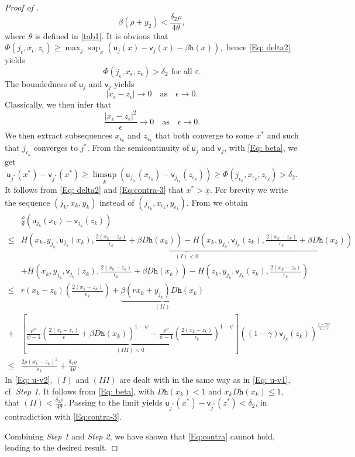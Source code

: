 \documentclass[11pt]{article}
\numberwithin{equation}{section}
\theoremstyle{definition}
\def\su{{\mathsf{u}}}
\def\sv{{\mathsf{v}}}
\newcommand{\eps}{\varepsilon}
\newcommand{\ux}{{\underline x}}
\newcommand{\beq}{\begin{equation}}
\newcommand{\eeq}{\end{equation}}
\newcommand{\f}{\frac}
\newcommand{\e}{\epsilon}
\newcommand{\g}{\gamma}
\newcommand{\p}{\psi}
\theoremstyle{plain}
\begin{document}
\begin{appendices}
\begin{proof}[Proof of ]
\beq\label{Eq: beta}
\beta(\rho+y_2)<\frac{\delta_2 \rho}{4\theta},
\eeq
where $\theta$ is defined in \cref{tab1}. It is obvious that 
$
\Phi(j_\e,x_\e,z_\e)\geq \max_j\sup_x(\mathsf{u}_j(x)-\mathsf{v}_j(x)-\beta \mathtt{h}(x)),
$
hence \cref{Eq: delta2} yields
 $$\Phi(j_\e,x_\e,z_\e)>\delta_2\,\,{\text{for all}}\, \,\eps.$$
The boundedness of $\mathsf{u}_j$ and $\mathsf{v}_j$ yields
{}{
$$
\vert x_\e-z_\e \vert\to 0\quad {\text{as}}\quad \e\to 0.
$$
}
Classically, we then infer that
{}{
$$
\frac{\vert x_\e-z_\e \vert^2}{\e}\to 0\quad {\text{as}}\quad \e\to 0.
$$
}
We then extract subsequences $x_{\e_k}$ and {}{$z_{\e_k}$} that both converge to some $x^*$ and such that $j_{\e_k}$ converges to $j^*$. 
From the semicontinuity of $\mathsf{u}_j$ and $\mathsf{v}_j$, with \eqref{Eq: beta}, we get 
\beq\label{Eq:contra-3}
\su_{j^*}(x^*)-\sv_{j^*}(x^*)\geq \limsup_k(\mathsf{u}_{j_{\e_k}}(x_{\e_k})-\mathsf{v}_{j_{\e_k}}(z_{\e_k}))\geq \Phi(j_{\e_k},x_{\e_k},z_{\e_k})>\delta_2.
\eeq
It follows from \cref{Eq: delta2} and \cref{Eq:contra-3} that $x^*>\ux$. 
For brevity we write the sequence $(j_{k},x_k,y_k)$ instead of $(j_{\e_k},x_{\e_k},y_{\e_k})$. From  we obtain
\begin{equation}\label{Eq: u-v2}
\begin{aligned}
&\frac{\rho}{\theta} (\su_{j_k}(x_k)-\sv_{j_k}(z_k) )\\
\leq {}&\underbrace{H\left(x_k,y_{j_{k}},\mathsf{u}_{j_{k}}(x_k),\f{2(x_k-z_k)}{\e_k}+\beta D\mathtt{h}(x_k)\right)-H\left(x_k,y_{j_k},\mathsf{v}_{j_{k}}(z_{k}),\f{2(x_k-z_k)}{\e_k}+\beta D\mathtt{h}(x_k)\right)}_{(I)<0}\\
&+H\left(x_{k},y_{j_{k}},\mathsf{v}_{j_{k}}(z_{k}),\f{2(x_k-z_k)}{\e_k}+\beta D\mathtt{h}(x_k)\right)-H\left(z_{k},y_{j_{k}},\mathsf{v}_{j_{k}}(z_{k}),\f{2(x_k-z_k)}{\e_k}\right)\\
\leq {}& r(x_{k}-z_{k})\left(\f{2(x_k-z_k)}{\e_k}\right)+\underbrace{\beta(rx_{k}+y_{j_{k}}) D\mathtt{h}(x_k)}_{(II)}\\
+&\left[\underbrace{\frac{\rho^{\p}}{\p-1}\left(\f{2(x_\e-z_\e)}{\e}+\beta D\mathtt{h}(x_k)\right)^{1-\p}
-\frac{\rho^{\p}}{\p-1}\left(\f{2(x_k-z_k)}{\e_k}\right)^{1-\p}}_{(III)<0}\right]((1-\g)\mathsf{v}_{j_{k}}(z_{k}))^{\frac{1-\g \p}{1-\g}}\\
\leq {}& \f{2\rho(x_k-z_k)^2}{\e_k}+\frac{\delta_2 \rho}{4\theta}.
\end{aligned}
\end{equation}
In \eqref{Eq: u-v2}, $(I)$ and $(III)$ are dealt with in the same way as in \eqref{Eq: u-v1}, cf. {\it{Step 1}}. It follows from \eqref{Eq: beta}, with $D\mathtt{h}(x_k)<1$ and $x_kD\mathtt{h}(x_k)\leq 1$, that $(II)<\frac{\delta_2 \rho}{4\theta}$.
Passing to the limit yields $\su_{j^*}(x^*)-\sv_{j^*}(z^*)<\delta_2$, in contradiction with \eqref{Eq:contra-3}. \par
Combining {\it{Step 1}} and {\it{Step 2}}, we have shown that \eqref{Eq:contra} cannot hold, leading to the desired result. 
\end{proof}



\end{appendices}
\end{document}
